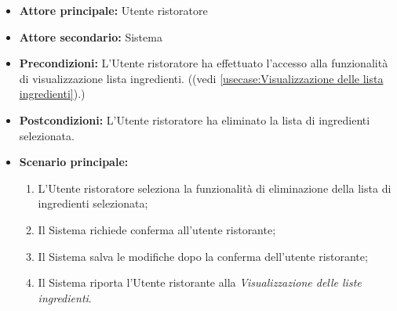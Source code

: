 \label{usecase:Elimina una lista degli ingredienti}
\begin{itemize}
	\item \textbf{Attore principale:} Utente ristoratore
	
	\item \textbf{Attore secondario:} Sistema

	\item \textbf{Precondizioni:} L'Utente ristoratore ha effettuato l'accesso
	alla funzionalità di visualizzazione lista ingredienti.
	((vedi \autoref{usecase:Visualizzazione delle lista ingredienti}).)

	\item \textbf{Postcondizioni:}
	      L'Utente ristoratore ha eliminato la lista di ingredienti selezionata.

	\item \textbf{Scenario principale:}
	      \begin{enumerate}
		      \item L'Utente ristoratore seleziona la funzionalità di
		            eliminazione della lista di ingredienti selezionata;

		      \item Il Sistema richiede conferma all'utente ristorante;
				
			  \item Il Sistema salva le modifiche dopo la conferma dell'utente ristorante;
			  
			  \item Il Sistema riporta l'Utente ristorante alla \textit{Visualizzazione delle liste ingredienti}.
	      \end{enumerate}
\end{itemize}
